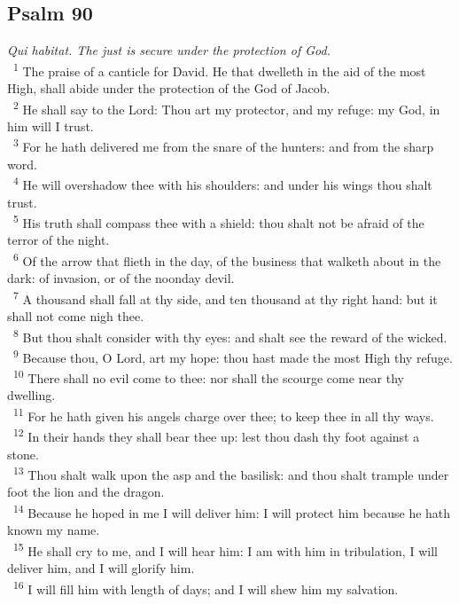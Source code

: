 \documentclass[a5paper,12pt]{article}
\begin{document}
\begin{multicols*}{2}
\section{Psalm 90}
\label{sec:orga28e899}
\emph{Qui habitat. The just is secure under the protection of God.}\\

~\textsuperscript{1} The praise of a canticle for David. He that dwelleth in the aid of the most High, shall abide under the protection of the God of Jacob.\\
~\textsuperscript{2} He shall say to the Lord: Thou art my protector, and my refuge: my God, in him will I trust.\\
~\textsuperscript{3} For he hath delivered me from the snare of the hunters: and from the sharp word.\\
~\textsuperscript{4} He will overshadow thee with his shoulders: and under his wings thou shalt trust.\\
~\textsuperscript{5} His truth shall compass thee with a shield: thou shalt not be afraid of the terror of the night.\\
~\textsuperscript{6} Of the arrow that flieth in the day, of the business that walketh about in the dark: of invasion, or of the noonday devil.\\
~\textsuperscript{7} A thousand shall fall at thy side, and ten thousand at thy right hand: but it shall not come nigh thee.\\
~\textsuperscript{8} But thou shalt consider with thy eyes: and shalt see the reward of the wicked.\\
~\textsuperscript{9} Because thou, O Lord, art my hope: thou hast made the most High thy refuge.\\
~\textsuperscript{10} There shall no evil come to thee: nor shall the scourge come near thy dwelling.\\
~\textsuperscript{11} For he hath given his angels charge over thee; to keep thee in all thy ways.\\
~\textsuperscript{12} In their hands they shall bear thee up: lest thou dash thy foot against a stone.\\
~\textsuperscript{13} Thou shalt walk upon the asp and the basilisk: and thou shalt trample under foot the lion and the dragon.\\
~\textsuperscript{14} Because he hoped in me I will deliver him: I will protect him because he hath known my name.\\
~\textsuperscript{15} He shall cry to me, and I will hear him: I am with him in tribulation, I will deliver him, and I will glorify him.\\
~\textsuperscript{16} I will fill him with length of days; and I will shew him my salvation.\\


\end{multicols*}
\end{document}
